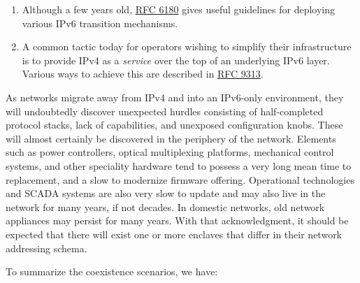 \documentclass[
]{article}
\begin{document}
\begin{enumerate}
\def\labelenumi{\arabic{enumi}.}
\item
  Although a few years old,
  \href{https://www.rfc-editor.org/info/rfc6180}{RFC 6180} gives useful
  guidelines for deploying various IPv6 transition mechanisms.
\item
  A common tactic today for operators wishing to simplify their
  infrastructure is to provide IPv4 as a \emph{service} over the top of
  an underlying IPv6 layer. Various ways to achieve this are described
  in \href{https://www.rfc-editor.org/info/rfc9313}{RFC 9313}.
\end{enumerate}

As networks migrate away from IPv4 and into an IPv6-only environment,
they will undoubtedly discover unexpected hurdles consisting of
half-completed protocol stacks, lack of capabilities, and unexposed
configuration knobs. These will almost certainly be discovered in the
periphery of the network. Elements such as power controllers, optical
multiplexing platforms, mechanical control systems, and other speciality
hardware tend to possess a very long mean time to replacement, and a
slow to modernize firmware offering. Operational technologies and SCADA
systems are also very slow to update and may also live in the network
for many years, if not decades. In domestic networks, old network
appliances may persist for many years. With that acknowledgment, it
should be expected that there will exist one or more enclaves that
differ in their network addressing schema.

To summarize the coexistence scenarios, we have:
\end{document}
